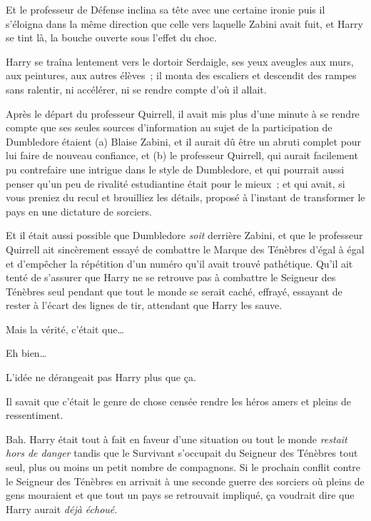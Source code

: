 Et le professeur de Défense inclina sa tête avec une certaine ironie puis il s'éloigna dans la même direction que celle vers laquelle Zabini avait fuit, et Harry se tint là, la bouche ouverte sous l'effet du choc.


Harry se traîna lentement vers le dortoir Serdaigle, ses yeux aveugles aux murs, aux peintures, aux autres élèves~; il monta des escaliers et descendit des rampes sans ralentir, ni accélérer, ni se rendre compte d'où il allait.

Après le départ du professeur Quirrell, il avait mis plus d'une minute à se rendre compte que ses seules sources d'information au sujet de la participation de Dumbledore étaient (a) Blaise Zabini, et il aurait dû être un abruti complet pour lui faire de nouveau confiance, et (b) le professeur Quirrell, qui aurait facilement pu contrefaire une intrigue dans le style de Dumbledore, et qui pourrait aussi penser qu'un peu de rivalité estudiantine était pour le mieux~; et qui avait, si vous preniez du recul et brouilliez les détails, proposé à l'instant de transformer le pays en une dictature de sorciers.

Et il était aussi possible que Dumbledore \emph{soit} derrière Zabini, et que le professeur Quirrell ait sincèrement essayé de combattre le Marque des Ténèbres d'égal à égal et d'empêcher la répétition d'un numéro qu'il avait trouvé pathétique. Qu'il ait tenté de s'assurer que Harry ne se retrouve pas à combattre le Seigneur des Ténèbres seul pendant que tout le monde se serait caché, effrayé, essayant de rester à l'écart des lignes de tir, attendant que Harry les sauve.

Mais la vérité, c'était que…

Eh bien…

L'idée ne dérangeait pas Harry plus que ça.

Il savait que c'était le genre de chose censée rendre les héros amers et pleins de ressentiment.

Bah. Harry était tout à fait en faveur d'une situation ou tout le monde \emph{restait hors de danger} tandis que le Survivant s'occupait du Seigneur des Ténèbres tout seul, plus ou moins un petit nombre de compagnons. Si le prochain conflit contre le Seigneur des Ténèbres en arrivait à une seconde guerre des sorciers où pleins de gens mouraient et que tout un pays se retrouvait impliqué, ça voudrait dire que Harry aurait \emph{déjà échoué}.

